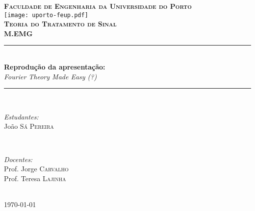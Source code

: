 \begin{titlepage}

    \newcommand{\HRule}{\rule{\linewidth}{0.4mm}} %
    
    \center      


    \textbf{\textsc{\Large Faculdade de Engenharia da Universidade do Porto}\\[2.5cm]}
    \texttt{[image: uporto-feup.pdf]}\\[2cm] 
    \textsc{\Large \bfseries Teoria do Tratamento de Sinal}\\[0.5cm] %
    \textsc{\large \bfseries M.EMG}\\[1cm] %
    
    
    \HRule \\[0.4cm]
    { \LARGE{\bfseries Reprodução da apresentação:} \\ \vspace{6pt}
    \emph{Fourier Theory Made Easy (?)}}\\[0.4cm] %
    \HRule \\[2cm]


    \begin{minipage}{0.4\textwidth}
        \begin{flushleft} \large
        \emph{Estudantes:}\\
        João \textsc{Sá Pereira} %
        \end{flushleft}
        \end{minipage}
        ~
        \begin{minipage}{0.4\textwidth}
        \begin{flushright} \large
        \emph{Docentes:} \\
        Prof. Jorge \textsc{Carvalho} \\
        Prof. Teresa \textsc{Lajinha} %
        \end{flushright}
        \end{minipage}\\[2.5cm]
    
    
    \vfill
    {\large \today}\\[1cm]

 

        

    \end{titlepage}